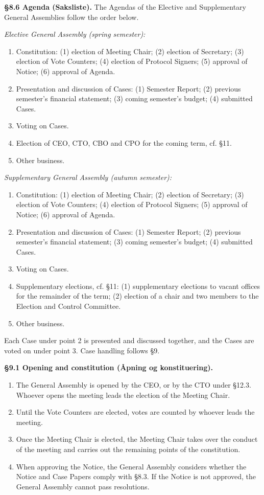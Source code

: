 \documentclass{../../../Common/Latex/Templates/rapport}
\begin{document}
\textbf{\S 8.6 Agenda (Saksliste).} The Agendas of the Elective and Supplementary General Assemblies follow the order below.

\emph{Elective General Assembly (spring semester):}
\begin{enumerate}
  \item Constitution: (1) election of Meeting Chair; (2) election of Secretary; (3) election of Vote Counters; (4) election of Protocol Signers; (5) approval of Notice; (6) approval of Agenda.
  \item Presentation and discussion of Cases: (1) Semester Report; (2) previous semester's financial statement; (3) coming semester's budget; (4) submitted Cases.
  \item Voting on Cases.
  \item Election of CEO, CTO, CBO and CPO for the coming term, cf. \S11.
  \item Other business.
\end{enumerate}

\emph{Supplementary General Assembly (autumn semester):}
\begin{enumerate}
  \item Constitution: (1) election of Meeting Chair; (2) election of Secretary; (3) election of Vote Counters; (4) election of Protocol Signers; (5) approval of Notice; (6) approval of Agenda.
  \item Presentation and discussion of Cases: (1) Semester Report; (2) previous semester's financial statement; (3) coming semester's budget; (4) submitted Cases.
  \item Voting on Cases.
  \item Supplementary elections, cf. \S11: (1) supplementary elections to vacant offices for the remainder of the term; (2) election of a chair and two members to the Election and Control Committee.
  \item Other business.
\end{enumerate}

Each Case under point 2 is presented and discussed together, and the Cases are voted on under point 3. Case handling follows \S9.

\textbf{\S 9.1 Opening and constitution (Åpning og konstituering).}
\begin{enumerate}
  \item The General Assembly is opened by the CEO, or by the CTO under \S12.3. Whoever opens the meeting leads the election of the Meeting Chair.
  \item Until the Vote Counters are elected, votes are counted by whoever leads the meeting.
  \item Once the Meeting Chair is elected, the Meeting Chair takes over the conduct of the meeting and carries out the remaining points of the constitution.
  \item When approving the Notice, the General Assembly considers whether the Notice and Case Papers comply with \S8.3. If the Notice is not approved, the General Assembly cannot pass resolutions.
\end{enumerate}
\end{document}
